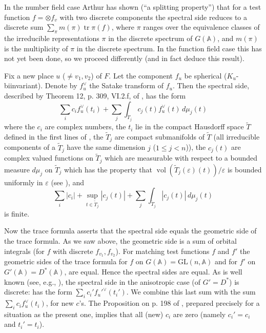 \documentclass[11pt,a4paper]{article}
\theoremstyle{plain}
\theoremstyle{definition}
\DeclareMathOperator{\tr}{tr}
\DeclareMathOperator{\vol}{vol}
\newcommand{\GL}{\mathrm{GL}}
\begin{document}
In the number field case Arthur has shown (``a splitting property'') that for a test function $f = \otimes f_v$ with two discrete components the spectral side reduces to a discrete sum $\sum_\pi m(\pi) \tr \pi(f)$, where $\pi$ ranges over the equivalence classes of the irreducible representations $\pi$ in the discrete spectrum of $G(\mathbb{A})$, and $m(\pi)$ is the multiplicity of $\pi$ in the discrete spectrum. In the function field case this has not yet been done, so we proceed differently (and in fact deduce this result).

Fix a new place $u$ ($\neq v_1, v_2$) of $F$. Let the component $f_u$ be spherical ($K_u$-biinvariant). Denote by $f_u^\vee$ the Satake transform of $f_u$. Then the spectral side, described by Theorem 12, p. 309, VI.2.f, of \cite{Laf}, has the form
\[
\sum_i c_i f_u^{\vee}(t_i) + \sum_j \int_{\tilde{T}_j} c_j(t) f_u^{\vee}(t) \, d\mu_j(t)
\]
where the $c_i$ are complex numbers, the $t_i$ lie in the compact Hausdorff space $\tilde{T}$ defined in the first lines of \cite[proof of Theorem 2, p. 197]{FK}, the $\tilde{T}_j$ are compact submanifolds of $\tilde{T}$ (all irreducible components of a $\tilde{T}_j$ have the same dimension $j$ ($1 \leq j < n$)), the $c_j(t)$ are complex valued functions on $\tilde{T}_j$ which are measurable with respect to a bounded measure $d\mu_j$ on $\tilde{T}_j$ which has the property that $\vol(\tilde{T}_j(\varepsilon)(t))/\varepsilon$ is bounded uniformly in $\varepsilon$ (see \cite[first paragraph in the proof of the Proposition, p. 198]{FK}), and
\[
\sum_i |c_i| + \sup_{t \in \tilde{T}_j} |c_j(t)| + \sum_j \int_{\tilde{T}_j} |c_j(t)| \, d\mu_j(t)
\]
is finite.

Now the trace formula asserts that the spectral side equals the geometric side of the trace formula. As we saw above, the geometric side is a sum of orbital integrals (for $f$ with discrete $f_{v_1}, f_{v_2}$). For matching test functions $f$ and $f'$ the geometric sides of the trace formula for $f$ on $G(\mathbb{A}) = \GL(n, \mathbb{A})$ and for $f'$ on $G'(\mathbb{A}) = D^*(\mathbb{A})$, are equal. Hence the spectral sides are equal. As is well known (see, e.g., \cite[Proposition, p. 191]{FK}), the spectral side in the anisotropic case (of $G' = D^*$) is discrete: has the form $\sum_i c_i' f_u'^{\vee}(t_i')$. We combine this last sum with the sum $\sum_i c_i f_u^{\vee}(t_i)$, for new $c$'s. The Proposition on p. 198 of \cite{FK}, prepared precisely for a situation as the present one, implies that all (new) $c_i$ are zero (namely $c_i' = c_i$ and $t_i' = t_i$).
\end{document}
